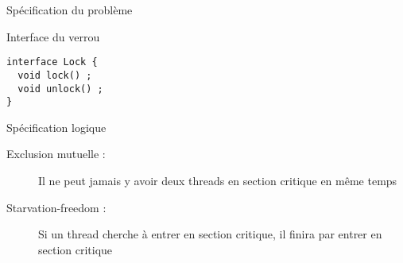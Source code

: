 
\begingroup

\begin{frame}[fragile]{Spécification du problème}

\begin{block}{Interface du verrou}
\begin{lstlisting}[numbers=none]
interface Lock {
  void lock() ;
  void unlock() ;
}
\end{lstlisting}
\end{block}

\begin{block}{Spécification logique}
\begin{description}
\item[Exclusion mutuelle : ] Il ne peut jamais y avoir deux threads en section critique en même temps
\item[Starvation-freedom : ] Si un thread cherche à entrer en section critique, il finira par entrer en section critique
\end{description}
\end{block}
\end{frame}

\endgroup
\endinput
